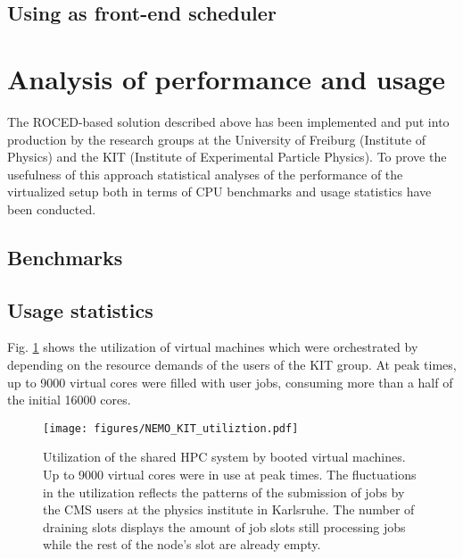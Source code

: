 \subsection{Using \Slurm as front-end scheduler}



\section{Analysis of performance and usage}

The ROCED-based solution described above has been implemented and put into production by the research groups at the University of Freiburg (Institute of Physics) and the KIT (Institute of Experimental
Particle Physics). To prove the usefulness of this approach
statistical analyses of the performance of the virtualized setup both
in terms of CPU benchmarks and usage statistics have been conducted.

\subsection{Benchmarks}




%
%
%
\subsection{Usage statistics}
Fig. \ref{fig-frplots} shows the utilization of virtual machines which were orchestrated by \Roced depending on the resource demands of the users of the KIT group.
At peak times, up to 9000 virtual cores were filled with user jobs, consuming more than a half of the initial 16000 \NEMO cores.

\begin{figure}
\begin{center}
  \texttt{[image: figures/NEMO\_KIT\_utiliztion.pdf]}
  \caption{Utilization of the shared HPC system by booted virtual machines. Up to 9000 virtual cores were in use at peak times. The fluctuations in the utilization reflects the patterns of the submission of jobs by the CMS users at the physics institute in Karlsruhe. The number of draining slots displays the amount of job slots still processing jobs while the rest of the node's slot are already empty.}
  \label{fig-frplots}
\end{center}
\end{figure}

